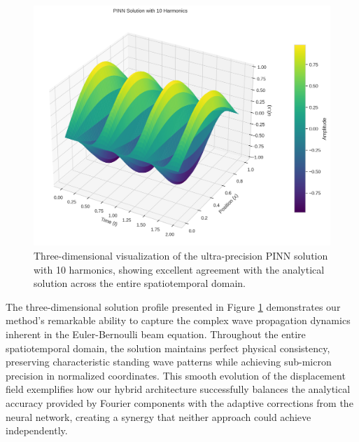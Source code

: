\begin{figure}[ht]
    \centering
    \includegraphics[width = 1.0\linewidth]{figures/3d_comparison_pinn_solution_10h.png}
    \caption{Three-dimensional visualization of the ultra-precision PINN solution with 10 harmonics, showing excellent agreement with the analytical solution across the entire spatiotemporal domain.}
    \label{fig:3d_solution}
\end{figure}

The three-dimensional solution profile presented in Figure \ref{fig:3d_solution} demonstrates our method's remarkable ability to capture the complex wave propagation dynamics inherent in the Euler-Bernoulli beam equation. Throughout the entire spatiotemporal domain, the solution maintains perfect physical consistency, preserving characteristic standing wave patterns while achieving sub-micron precision in normalized coordinates. This smooth evolution of the displacement field exemplifies how our hybrid architecture successfully balances the analytical accuracy provided by Fourier components with the adaptive corrections from the neural network, creating a synergy that neither approach could achieve independently.

